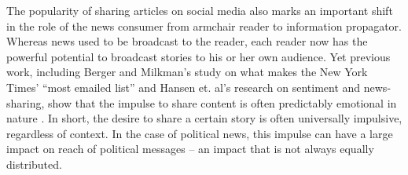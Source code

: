 \documentclass[letterpaper]{article}
\begin{document}



The popularity of sharing articles on social media also marks an important shift in the role of the news consumer from armchair reader to information propagator. Whereas news used to be broadcast to the reader, each reader now has the powerful potential to broadcast stories to his or her own audience. Yet previous work, including Berger and Milkman's study on what makes the New York Times' ``most emailed list'' and Hansen et. al's research on sentiment and news-sharing, show that the impulse to share content is often predictably emotional in nature \cite{berger2012makes, hansen2011good}. In short, the desire to share a certain story is often universally impulsive, regardless of context. In the case of political news, this impulse can have a large impact on reach of political messages -- an impact that is not always equally distributed. 
  
\end{document}
